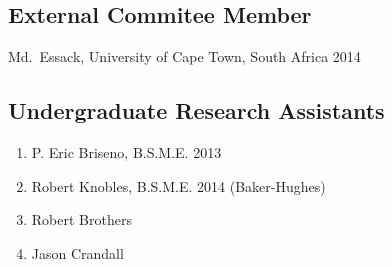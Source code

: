 \subsection*{External Commitee Member}
Md.~Essack, University of Cape Town, South Africa 2014

\subsection*{Undergraduate Research Assistants}
  \begin{enumerate}
    \item P. Eric Briseno, B.S.M.E. 2013
    \item Robert Knobles, B.S.M.E. 2014 (Baker-Hughes)
    \item Robert Brothers
    \item Jason Crandall
  \end{enumerate}


